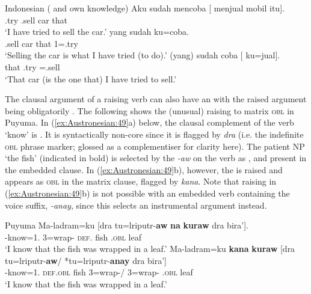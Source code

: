 \documentclass[output=paper,chinesefont]{../langscibook}
\begin{document}
\ea\label{ex:Austronesian:48} Indonesian  (\citealt[31]{Arka2014} and own knowledge)
\ea\gll
Aku sudah mencoba [ menjual mobil itu]\textsubscript{\XCOMP}. {\vrule height 1.5ex depth 2ex width 0pt}\\
 {\PFV} \AV.try {} \AV.sell car that\\
\glt`I have tried to sell the car.'
\ex{}\textsubscript{\PIVOT} yang sudah ku=coba.\\
 {} \AV.sell car that {\FOC} {\PFV} {1\SG}=\UV.try\\
\glt`Selling the car is what I have tried (to do).'
\ex{}\textsubscript{\PIVOT} (yang) sudah  {\GAP} coba [{\GAP} ku=jual]\textsubscript{\XCOMP}. {\vrule height 1.5ex depth 2.5ex width 0pt}\\
\phantom{[} that \phantom{(}{\FOC} {\PFV}  \UV.try \phantom{[} =\UV.sell\\
\glt`That car (is the one that) I have tried to sell.'
\z\z

The clausal argument of a raising verb can also have an \XCOMP with the raised argument being obligatorily \SUBJ. The following shows the (unusual) \SUBJ raising to matrix \textsc{obl} in Puyuma. In (\ref{ex:Austronesian:49}a) below, the clausal complement of the verb `know' is \COMP. It is syntactically non-core since it is flagged by \emph{dra} (i.e. the indefinite \textsc{obl} phrase marker; glossed as a complementiser for clarity here). The patient NP `the fish' (indicated in bold) is selected by the \PV \emph{-aw} on the verb as \SUBJ, and present in the embedded clause. In (\ref{ex:Austronesian:49}b), however, the \SUBJ is raised and appears as \textsc{obl} in the matrix clause, flagged by \emph{kana}. Note that raising in (\ref{ex:Austronesian:49}b) is not possible with an embedded verb containing the voice suffix, \emph{-anay}, since this selects an instrumental argument instead.

\ea\label{ex:Austronesian:49} Puyuma  \citep[153-154]{Teng2008}
\ea\gll
Ma-ladram=ku [dra tu=lriputr-\textbf{aw} \textbf{na}  \textbf{kuraw} dra bira']\textsubscript{\COMP}.\\
\INTR-know=1\SG.{\NOM} \phantom{[}{\COMP} 3{\GEN}=wrap-{\PV} \textsc{def}.{\NOM} fish  \INDF.\textsc{obl} leaf\\
\glt `I know that the fish was wrapped in a leaf.'
\ex\gll
Ma-ladram=ku   \textbf{kana}  \textbf{kuraw} [dra tu=lriputr-\textbf{aw}/ *tu=lriputr-\textbf{anay} dra bira']\textsubscript{\XCOMP}\\
\INTR-know=1\SG.{\NOM} \textsc{def}.\textsc{obl} fish \phantom{[}{\COMP} 3{\GEN}=wrap-\PV/ 3{\GEN}=wrap-{\IV}
\INDF.\textsc{obl} leaf\\
\glt`I know that the fish was wrapped in a leaf.'
\z\z
\end{document}
